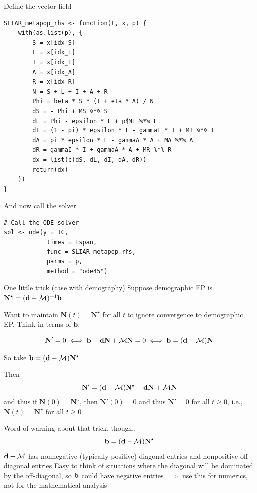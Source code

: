 \documentclass[aspectratio=43]{beamer}
\begin{document}
\begin{frame}[fragile]{Define the vector field}
\begin{lstlisting}[language=Renhanced]
SLIAR_metapop_rhs <- function(t, x, p) {
	with(as.list(p), {
		S = x[idx_S]
		L = x[idx_L]
		I = x[idx_I]
		A = x[idx_A]
		R = x[idx_R]
		N = S + L + I + A + R
		Phi = beta * S * (I + eta * A) / N
		dS = - Phi + MS %*% S
		dL = Phi - epsilon * L + p$ML %*% L
		dI = (1 - pi) * epsilon * L - gammaI * I + MI %*% I
		dA = pi * epsilon * L - gammaA * A + MA %*% A
		dR = gammaI * I + gammaA * A + MR %*% R
		dx = list(c(dS, dL, dI, dA, dR))
		return(dx)
	})
}	
\end{lstlisting}
\end{frame}
	

\begin{frame}[fragile]{And now call the solver}
\begin{lstlisting}
# Call the ODE solver
sol <- ode(y = IC, 
			times = tspan, 
			func = SLIAR_metapop_rhs, 
			parms = p,
			method = "ode45")
\end{lstlisting}	
\end{frame}
	
\begin{frame}[fragile]{One little trick (case with demography)}
	Suppose demographic EP is $\mathbf{N}^\star=(\mathbf{d}-\mathcal{M})^{-1}\mathbf{b}$

	Want to maintain $\mathbf{N}(t)=\mathbf{N}^\star$ for all $t$ to ignore convergence to demographic EP. Think in terms of $\mathbf{b}$:
	
	$$
	\mathbf{N}'=0\iff \mathbf{b}-\mathbf{d}\mathbf{N}+\mathcal{M}\mathbf{N}=0 \iff \mathbf{b} = (\mathbf{d}-\mathcal{M})\mathbf{N}
	$$
	
	So take $\mathbf{b}=(\mathbf{d}-\mathcal{M})\mathbf{N}^\star$
	
	Then
	$$
	\mathbf{N}' = (\mathbf{d}-\mathcal{M})\mathbf{N}^\star
	-\mathbf{d}\mathbf{N}+\mathcal{M}\mathbf{N}
	$$
	and thus if $\mathbf{N}(0)=\mathbf{N}^\star$, then $\mathbf{N}'(0)=0$ and thus $\mathbf{N}'=0$ for all $t\geq 0$, i.e., $\mathbf{N}(t)=\mathbf{N}^\star$ for all $t\geq 0$
\end{frame}

\begin{frame}{Word of warning about that trick, though..}
$$
\mathbf{b}=(\mathbf{d}-\mathcal{M})\mathbf{N}^\star
$$
\vfill
$\mathbf{d}-\mathcal{M}$ has nonnegative (typically positive) diagonal entries and nonpositive off-diagonal entries
\vfill
Easy to think of situations where the diagonal will be dominated by the off-diagonal, so $\mathbf{b}$ could have negative entries
\vfill
$\implies$ use this for numerics, not for the mathematical analysis
\end{frame}
\end{document}
